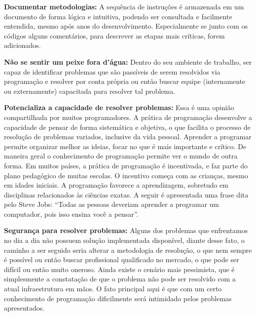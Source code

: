 \documentclass[
  11pt,
  a5paper,
  openany]{book}
\begin{document}
\textbf{Documentar metodologias:} A sequência de instruções é armazenada em um documento de forma lógica e intuitiva, podendo ser consultada e facilmente entendida, mesmo após anos do desenvolvimento. Especialmente se junto com os códigos alguns comentários, para descrever as etapas mais críticas, forem adicionados.

\textbf{Não se sentir um peixe fora d'água:} Dentro do seu ambiente de trabalho, ser capaz de identificar problemas que são passíveis de serem resolvidos via programação e resolver por conta própria ou então buscar equipe (internamente ou externamente) capacitada para resolver tal problema.

\textbf{Potencializa a capacidade de resolver problemas:} Essa é uma opinião compartilhada por muitos programadores. A prática de programação desenvolve a capacidade de pensar de forma sistemática e objetiva, o que facilita o processo de resolução de problemas variados, inclusive da vida pessoal. Aprender a programar permite organizar melhor as ideias, focar no que é mais importante e crítico. De maneira geral o conhecimento de programação permite ver o mundo de outra forma. Em muitos países, a prática de programação é incentivada, e faz parte do plano pedagógico de muitas escolas. O incentivo começa com as crianças, mesmo em idades iniciais. A programação favorece a aprendizagem, sobretudo em disciplinas relacionados às ciências exatas. A seguir é apresentada uma frase dita pelo Steve Jobs: ``Todas as pessoas deveriam aprender a programar um computador, pois isso ensina você a pensar''.

\textbf{Segurança para resolver problemas:} Alguns dos problemas que enfrentamos no dia a dia não possuem solução implementada disponível, diante desse fato, o caminho a ser seguido seria alterar a metodologia de resolução, o que nem sempre é possível ou então buscar profissional qualificado no mercado, o que pode ser difícil ou então muito oneroso. Ainda existe o cenário mais pessimista, que é simplesmente a constatação de que o problema não pode ser resolvido com a atual infraestrutura em mãos. O fato principal aqui é que com um certo conhecimento de programação dificilmente será intimidado pelos problemas apresentados.
\end{document}
